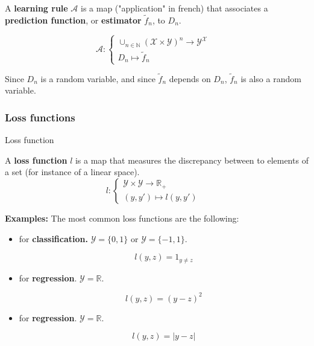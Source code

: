 \documentclass[
10pt, %
a4paper, %
oneside, %
headinclude,footinclude, %
BCOR5mm, %
]{scrartcl}
\begin{document}
A \textbf{{learning rule}} $ \mathcal{A} $ is a map ("application" in french) that associates a \textbf{{prediction function}}, or \textbf{{estimator}}  $ \tilde{f}_n$, to $D_n$.

$$
\mathcal{A}  : \left\{
    \begin{array}{ll}
	\cup_{n\in \mathbb{N} } ( \mathcal{X} \times \mathcal{Y} )^n\rightarrow \mathcal{Y}^{ \mathcal{X} } & \\
        D_n \mapsto \tilde{f}_n& 
    \end{array}
\right.
$$

Since $D_n$ is a random variable, and since $ \tilde{f}_n$ depends on $D_n$, $ \tilde{f}_n$ is also a random variable.

\subsubsection{\large\color{Periwinkle}Loss functions}

\begin{definition}{Loss function}

    A \textbf{{loss function}} $l$ is a map that measures the discrepancy between to elements of a set (for instance of a linear space).
$$
l: \left\{
    \begin{array}{ll}
	\mathcal{Y} \times \mathcal{Y} \rightarrow \mathbb{R}_+ & \\
	(y,y') \mapsto l(y,y')& 
    \end{array}
\right.
$$

\end{definition}

\textbf{{Examples:}} The most common loss functions are the following:
\begin{itemize}
    \item["0-1" loss] for \textbf{{classification.}} $ \mathcal{Y}  = \{0, 1\}$ or $ \mathcal{Y}  = \{-1, 1\}$.

	\begin{equation}
	    l(y,z) = 1_{y\neq z}
	\end{equation}
    \item[square loss] for \textbf{{regression}}. $ \mathcal{Y}  = \mathbb{R} $. 

	\begin{equation}
	    l(y,z) = (y-z)^2
	\end{equation}
    \item[absolute loss] for \textbf{{regression}}. $ \mathcal{Y}  = \mathbb{R} $. 

	\begin{equation}
	    l(y,z) = |y-z|
	\end{equation}
\end{itemize}
\end{document}
